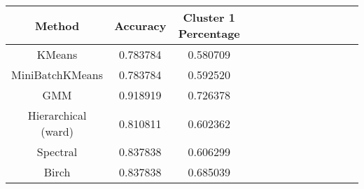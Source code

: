 \begin{tabular}{ccccccccccccc}
\toprule
             Method &  Accuracy &  Cluster 1 Percentage \\
\midrule
             KMeans &  0.783784 &              0.580709 \\
    MiniBatchKMeans &  0.783784 &              0.592520 \\
                GMM &  0.918919 &              0.726378 \\
Hierarchical (ward) &  0.810811 &              0.602362 \\
           Spectral &  0.837838 &              0.606299 \\
              Birch &  0.837838 &              0.685039 \\
\bottomrule
\end{tabular}
